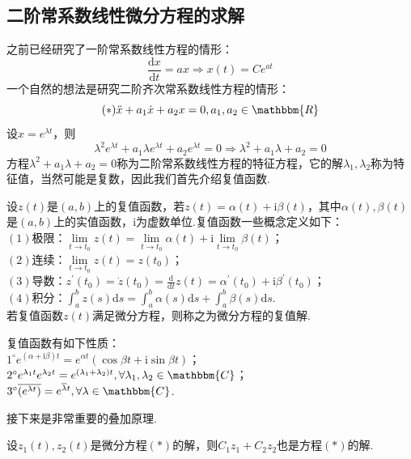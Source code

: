 \documentclass{ctexart}
\begin{document}
\subsection{二阶常系数线性微分方程的求解}
之前已经研究了一阶常系数线性方程的情形：
$$\frac{\mathrm{d}x}{\mathrm{d}t}=ax\Rightarrow x(t)=Ce^{at}$$
一个自然的想法是研究二阶齐次常系数线性方程的情形：
$$(*)\ddot{x}+a_{1}\dot{x}+a_{2}x=0,a_{1},a_{2}\in\mathbbm{R}$$
设$x=e^{\lambda t}$，则
$$\lambda^{2}e^{\lambda t}+a_{1}\lambda e^{\lambda t}+a_{2} e^{\lambda t}=0\Rightarrow \lambda^{2}+a_{1}\lambda+a_{2}=0$$
方程$\lambda^{2}+a_{1}\lambda+a_{2}=0$称为二阶常系数线性方程的特征方程，它的解$\lambda_{1},\lambda_{2}$称为特征值，当然可能是复数，因此我们首先介绍复值函数.

\begin{definition}
设$z(t)$是$(a,b)$上的复值函数，若$z(t)=\alpha(t)+\mathrm{i}\beta(t)$，其中$\alpha(t),\beta(t)$是$(a,b)$上的实值函数，$\mathrm{i}$为虚数单位.复值函数一些概念定义如下：\\
$(1)$极限：$\lim\limits_{t\to t_{0}}{z(t)}=\lim\limits_{t\to t_{0}}{\alpha(t)}+\mathrm{i}\lim\limits_{t\to t_{0}}{\beta(t)}$；\\
$(2)$连续：$\lim\limits_{t\to t_{0}}{z(t)}=z(t_{0})$；\\
$(3)$导数：$z^{\prime}(t_{0})=\dot{z}(t_{0})=\frac{\mathrm{d}}{\mathrm{d}t}z(t)=\alpha^{\prime}(t_{0})+\mathrm{i}\beta^{\prime}(t_{0})$；\\
$(4)$积分：$\int_{a}^{b}{z(s)\mathrm{d}s}=\int_{a}^{b}{\alpha(s)\mathrm{d}s}+\int_{a}^{b}{\beta(s)\mathrm{d}s}$.\\
若复值函数$z(t)$满足微分方程，则称之为微分方程的复值解.
\end{definition}

\begin{theorem}[复值函数的性质]
复值函数有如下性质：\\
$1^{\circ}e^{(\alpha+\mathrm{i}\beta)t}=e^{\alpha t}(\cos{\beta t}+\mathrm{i}\sin{\beta t})$；\\
$2^{\circ}e^{\lambda_{1}t}e^{\lambda_{2}t}=e^{(\lambda_{1}+\lambda_{2})t},\forall \lambda_{1},\lambda_{2}\in\mathbbm{C}$；\\
$3^{\circ}\overline{(e^{\lambda t})}=e^{\overline{\lambda}t},\forall \lambda\in\mathbbm{C}$.
\end{theorem}

接下来是非常重要的叠加原理.
\begin{theorem}[叠加原理]
设$z_{1}(t),z_{2}(t)$是微分方程$(*)$的解，则$C_{1}z_{1}+C_{2}z_{2}$也是方程$(*)$的解.
\end{theorem}
\end{document}
